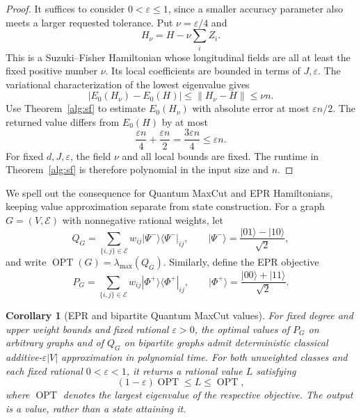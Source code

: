 \documentclass[reqno]{amsart}
\newtheorem{corollary}[theorem]{Corollary}
\theoremstyle{definition}
\theoremstyle{remark}
\begin{document}
\begin{proof}
It suffices to consider \(0<\varepsilon\le1\), since a smaller
accuracy parameter also meets a larger requested tolerance.
Put \(\nu=\varepsilon/4\) and
\[
 H_\nu=H-\nu\sum_i Z_i.
 \]
This is a Suzuki--Fisher Hamiltonian whose longitudinal fields
are all at least the fixed positive number \(\nu\).
Its local coefficients are bounded in terms of \(J,\varepsilon\).
The variational characterization of the lowest eigenvalue gives
\[
 |E_0(H_\nu)-E_0(H)|
 \le\|H_\nu-H\|\le\nu n.
 \]
Use Theorem~\ref{alg:sf} to estimate \(E_0(H_\nu)\) with
absolute error at most \(\varepsilon n/2\).
The returned value differs from \(E_0(H)\) by at most
\[
 \frac{\varepsilon n}{4}+\frac{\varepsilon n}{2}
   =\frac{3\varepsilon n}{4}
   \le\varepsilon n.
 \]
For fixed \(d,J,\varepsilon\), the field \(\nu\) and all local
bounds are fixed.  The runtime in Theorem~\ref{alg:sf} is
therefore polynomial in the input size and \(n\).
\end{proof}

We spell out the consequence for Quantum MaxCut and EPR
Hamiltonians, keeping value approximation separate from state
construction.
For a graph \(G=(V,\mathcal E)\) with nonnegative rational weights, let
\[
 Q_G=\sum_{\{i,j\}\in\mathcal E}
      w_{ij}|\Psi^-\rangle\langle\Psi^-|_{ij},
 \qquad
 |\Psi^-\rangle=\frac{|01\rangle-|10\rangle}{\sqrt2},
 \]
and write \(\operatorname{OPT}(G)=\lambda_{\max}(Q_G)\).
Similarly, define the EPR objective
\[
 P_G=\sum_{\{i,j\}\in\mathcal E}
      w_{ij}|\Phi^+\rangle\langle\Phi^+|_{ij},
 \qquad
 |\Phi^+\rangle=\frac{|00\rangle+|11\rangle}{\sqrt2}.
 \]

\begin{corollary}[EPR and bipartite Quantum MaxCut values]
\label{alg:qmc}
For fixed degree and upper weight bounds and fixed rational
\(\varepsilon>0\), the optimal values of \(P_G\) on arbitrary
graphs and of \(Q_G\) on bipartite graphs admit deterministic
classical additive-\(\varepsilon |V|\) approximation in
polynomial time.
For both unweighted classes and each fixed rational \(0<\varepsilon<1\),
it returns a rational value \(L\) satisfying
\[
 (1-\varepsilon)\operatorname{OPT}\le L\le\operatorname{OPT},
\]
where \(\operatorname{OPT}\) denotes the largest eigenvalue of the
respective objective. The output is a value, rather than a state
attaining it.
\end{corollary}
\end{document}
